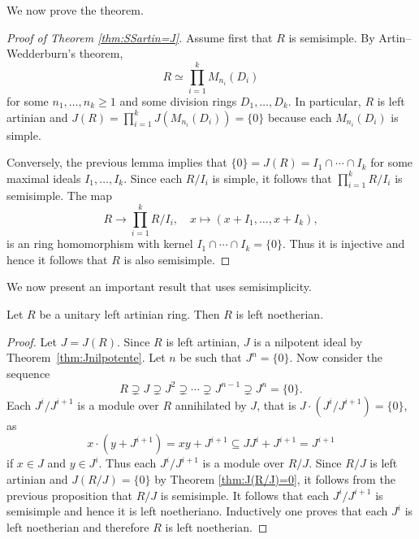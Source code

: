 We now prove the theorem. 

\begin{proof}[Proof of Theorem \ref{thm:SSartin=J}]
	Assume first that $R$ is semisimple. By Artin--Wedderburn's theorem, 
	\[
		R\simeq\prod_{i=1}^kM_{n_i}(D_i)
	\]
	for some $n_1,\dots,n_k\geq1$ and some division rings $D_1,\dots,D_k$. 
	In particular, $R$ is left artinian and $J(R)=\prod_{i=1}^kJ(M_{n_i}(D_i))=\{0\}$
	because each $M_{n_i}(D_i)$ is simple. 

    Conversely, the previous lemma implies that $\{0\}=J(R)=I_1\cap\cdots\cap I_k$ for some
    maximal ideals $I_1,\dots,I_k$. Since each $R/I_i$ is simple, it follows that 
    $\prod_{i=1}^k R/I_i$ is semisimple. The map 
	\[
	R\to \prod_{i=1}^k R/I_i,\quad
	x\mapsto (x+I_1,\dots,x+I_k),
	\]
	is an ring homomorphism with 
	kernel $I_1\cap\cdots\cap I_k=\{0\}$. Thus it is injective and hence 
	it follows that $R$ 
	is also semisimple. 
\end{proof}





We now present an important result that uses 
semisimplicity. 

\begin{theorem}
	\label{thm:Hopkins-Levitski}
	Let $R$ be a unitary left artinian ring. Then $R$ is left noetherian.
\end{theorem}

\begin{proof}
	Let $J=J(R)$. Since $R$ is left artinian, $J$ is a nilpotent ideal 
	by Theorem~\ref{thm:Jnilpotente}. Let $n$ be such that $J^n=\{0\}$. Now consider the sequence 
	\[
		R\supsetneq J\supsetneq J^2\supsetneq\cdots\supsetneq J^{n-1}\supsetneq J^n=\{0\}.
	\]
	Each $J^{i}/J^{i+1}$ is a module over $R$ annihilated by $J$, 
	that is $J\cdot (J^i/J^{i+1})=\{0\}$, as 
	\[
	x\cdot (y+J^{i+1})=xy+J^{i+1}\subseteq JJ^i+J^{i+1}=J^{i+1} 
	\]
	if $x\in J$ and $y\in J^i$. 
	Thus each  
	$J^i/J^{i+1}$ is a module over $R/J$. Since $R/J$ is left artinian and 
	$J(R/J)=\{0\}$ by Theorem \ref{thm:J(R/J)=0}, it follows from the previous proposition that $R/J$ is semisimple. 
	It follows that each $J^{i}/J^{i+1}$ 
	is semisimple and hence it is left noetheriano. Inductively one proves that each 
	$J^i$ is left noetherian and therefore $R$ is left noetherian. 
\end{proof}


